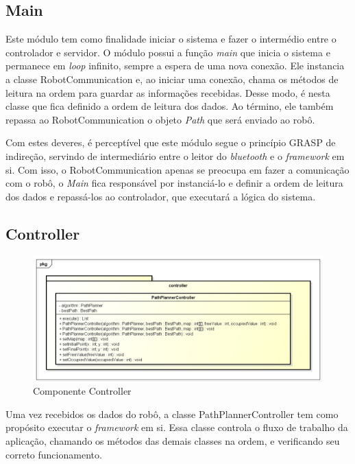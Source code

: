 \subsection{Main}

Este módulo tem como finalidade iniciar o sistema e fazer o intermédio entre o controlador e servidor. O módulo possui a função \textit{main} que inicia o sistema e permanece em \textit{loop} infinito, sempre a espera de uma nova conexão. Ele instancia a classe RobotCommunication e, ao iniciar uma conexão, chama os métodos de leitura na ordem para guardar as informações recebidas. Desse modo, é nesta classe que fica definido a ordem de leitura dos dados. Ao término, ele também repassa ao RobotCommunication o objeto \textit{Path} que será enviado ao robô.

Com estes deveres, é perceptível que este módulo segue o princípio GRASP de indireção, servindo de intermediário entre o leitor do \textit{bluetooth} e o \textit{framework} em si. Com isso, o RobotCommunication apenas se preocupa em fazer a comunicação com o robô, o \textit{Main} fica responsável por instanciá-lo e definir a ordem de leitura dos dados e repassá-los ao controlador, que executará a lógica do sistema.

\subsection{Controller}

\begin{figure}[h]
	\centering
	\label{fig25}
		\includegraphics[keepaspectratio=true,scale=0.6]{figuras/pkgcontroller.png}
	\caption{Componente Controller}
\end{figure}

Uma vez recebidos os dados do robô, a classe PathPlannerController tem como propósito executar o \textit{framework} em si. Essa classe controla o fluxo de trabalho da aplicação, chamando os métodos das demais classes na ordem, e verificando seu correto funcionamento.

